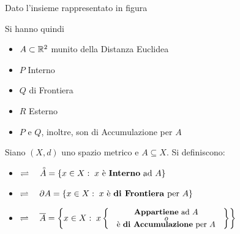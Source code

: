 \begin{example} %
	Dato l'insieme rappresentato in figura
	\begin{center}
	\end{center}
	Si hanno quindi
	\begin{itemize}[noitemsep]
		\item $A \subset \mathbb{R}^2$ munito della Distanza Euclidea
		\item $P$ Interno
		\item $Q$ di Frontiera
		\item $R$ Esterno
		\item $P$ e $Q$, inoltre, son di Accumulazione per $A$
	\end{itemize}
\end{example}
\begin{definition}
	\label{def:topologia_spa_metri}
	Siano $(X,d)$ uno spazio metrico e $A \subseteq X$. Si definiscono:
	\begin{itemize}
		\item {}
			$\rightleftharpoons \quad \accentset{\circ}{A} = \left\{x \in X:\; x \text{ è \textbf{Interno} ad } A\right\}$
		\item {}
			$\rightleftharpoons \quad \partial A = \left\{x \in X:\; x \text{ è \textbf{di Frontiera} per } A\right\}$
		\item {}
			$\bydef \quad \overline{A} = \brackets{
			x \in X:\; x \brackets{
				\text{
					\small
					\begin{tabular}{c}
						\textbf{Appartiene} ad $A$\\[-1ex]
						\textit{o}\\[-1ex]
						è \textbf{di Accumulazione} per $A$
					\end{tabular}
					}
				}
			}$
	\end{itemize}
\end{definition}
